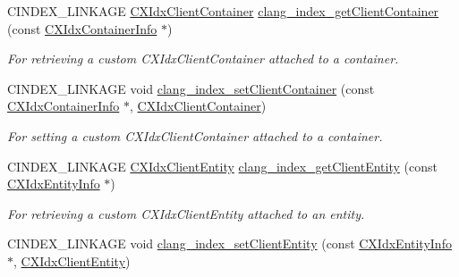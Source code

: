 \begin{DoxyCompactItemize}
\item 
\mbox{\label{group__CINDEX__HIGH_gaca430242bc5e6f6faaac3aa39105b5c1}} 
C\+I\+N\+D\+E\+X\+\_\+\+L\+I\+N\+K\+A\+GE \hyperlink{group__CINDEX__HIGH_ga0dac2cb977094bbd9d13b9d8abed278f}{C\+X\+Idx\+Client\+Container} \hyperlink{group__CINDEX__HIGH_gaca430242bc5e6f6faaac3aa39105b5c1}{clang\+\_\+index\+\_\+get\+Client\+Container} (const \hyperlink{structCXIdxContainerInfo}{C\+X\+Idx\+Container\+Info} $\ast$)
\begin{DoxyCompactList}\small\item\em For retrieving a custom C\+X\+Idx\+Client\+Container attached to a container. \end{DoxyCompactList}\item 
\mbox{\label{group__CINDEX__HIGH_ga85255b4017399b012f9967125a3a36e8}} 
C\+I\+N\+D\+E\+X\+\_\+\+L\+I\+N\+K\+A\+GE void \hyperlink{group__CINDEX__HIGH_ga85255b4017399b012f9967125a3a36e8}{clang\+\_\+index\+\_\+set\+Client\+Container} (const \hyperlink{structCXIdxContainerInfo}{C\+X\+Idx\+Container\+Info} $\ast$, \hyperlink{group__CINDEX__HIGH_ga0dac2cb977094bbd9d13b9d8abed278f}{C\+X\+Idx\+Client\+Container})
\begin{DoxyCompactList}\small\item\em For setting a custom C\+X\+Idx\+Client\+Container attached to a container. \end{DoxyCompactList}\item 
\mbox{\label{group__CINDEX__HIGH_ga1731a531a2a24471cef7288623b9820b}} 
C\+I\+N\+D\+E\+X\+\_\+\+L\+I\+N\+K\+A\+GE \hyperlink{group__CINDEX__HIGH_gaaa7374e63b63b3d14af7cf87af386955}{C\+X\+Idx\+Client\+Entity} \hyperlink{group__CINDEX__HIGH_ga1731a531a2a24471cef7288623b9820b}{clang\+\_\+index\+\_\+get\+Client\+Entity} (const \hyperlink{structCXIdxEntityInfo}{C\+X\+Idx\+Entity\+Info} $\ast$)
\begin{DoxyCompactList}\small\item\em For retrieving a custom C\+X\+Idx\+Client\+Entity attached to an entity. \end{DoxyCompactList}\item 
\mbox{\label{group__CINDEX__HIGH_ga3b68cac914a9bf52ad54467cd5dbfbc7}} 
C\+I\+N\+D\+E\+X\+\_\+\+L\+I\+N\+K\+A\+GE void \hyperlink{group__CINDEX__HIGH_ga3b68cac914a9bf52ad54467cd5dbfbc7}{clang\+\_\+index\+\_\+set\+Client\+Entity} (const \hyperlink{structCXIdxEntityInfo}{C\+X\+Idx\+Entity\+Info} $\ast$, \hyperlink{group__CINDEX__HIGH_gaaa7374e63b63b3d14af7cf87af386955}{C\+X\+Idx\+Client\+Entity})

\end{DoxyCompactItemize}

